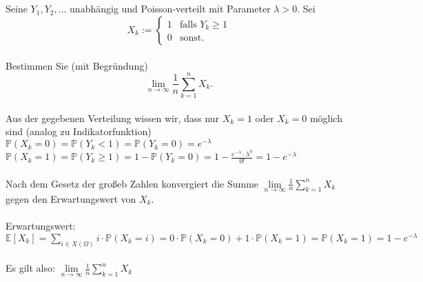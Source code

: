 \documentclass[a4paper]{article}
\begin{document}
\setcounter{section}{9}
\subsection{}
Seine $Y_1,Y_2,\dots$ unabhängig und Poisson-verteilt mit Parameter $\lambda>0$. Sei
\[X_k := \begin{cases}
    1 & \text{falls } Y_k \geq 1\\
    0 & \text{sonst.}
\end{cases}\]\\
Bestimmen Sie (mit Begründung)
\[\lim\limits_{n\to\infty} \frac{1}{n} \sum\limits^n_{k=1}X_k.\]\\
Aus der gegebenen Verteilung wissen wir, dass nur $X_k=1$ oder $X_k=0$ möglich sind (analog zu Indikatorfunktion)\\
\(\mathbb{P}(X_k=0)=\mathbb{P}(Y_k<1)=\mathbb{P}(Y_k=0)=e^{-\lambda}\)\\
\(\mathbb{P}(X_k=1)=\mathbb{P}(Y_k\geq 1)=1-\mathbb{P}(Y_k=0)=1-\frac{e^{-\lambda}\cdot\lambda^0}{0!}=1-e^{-\lambda}\)\\\\
Nach dem Gesetz der großeb Zahlen konvergiert die Summe $\lim\limits_{n\to\infty}\frac{1}{n}\sum\limits^n_{k=1}X_k$ gegen den Erwartungswert von $X_k$.\\\\
Erwartungswert:\\
\(\mathbb{E}[X_k]=\sum\limits_{i \in X(\Omega)}i\cdot \mathbb{P}(X_k=i)=0\cdot \mathbb{P}(X_k=0)+1\cdot \mathbb{P}(X_k=1)=\mathbb{P}(X_k=1)=1-e^{-\lambda}\)\\\\
Es gilt also: \(\lim\limits_{n\to\infty} \frac{1}{n} \sum\limits^n_{k=1}X_k\)
\end{document}

